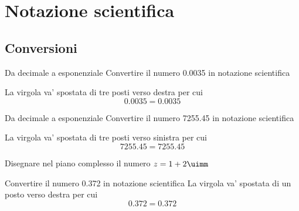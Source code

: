 \chapter{Notazione scientifica}
\label{cha:Notazionescietifica}
 
\section{Conversioni}


\begin{esempiot}{Da decimale a esponenziale}{}
	Convertire il numero \num{0.0035} in notazione scientifica
\end{esempiot}
La virgola va' spostata di tre posti verso destra per cui
\[\num{0.0035}=\num[scientific-notation=true]{0.0035}\]
\begin{esempiot}{Da decimale a esponenziale}{}
	Convertire il numero \num{7255.45} in notazione scientifica
\end{esempiot}
La virgola va' spostata di tre posti verso sinistra per cui
\[\num{7255.45}=\num[scientific-notation=true]{7255.45}\]
\tcbstartrecording
\begin{exercise}[no solution]
	Disegnare nel piano complesso il numero $z=1+2\uimm$
\end{exercise}
\begin{exercise}
	Convertire il numero \num{0.372} in notazione scientifica
	\tcblower
	La virgola va' spostata di un posto verso destra per cui
	\[\num{0.372}=\num[scientific-notation=true]{0.372}\]
\end{exercise}
